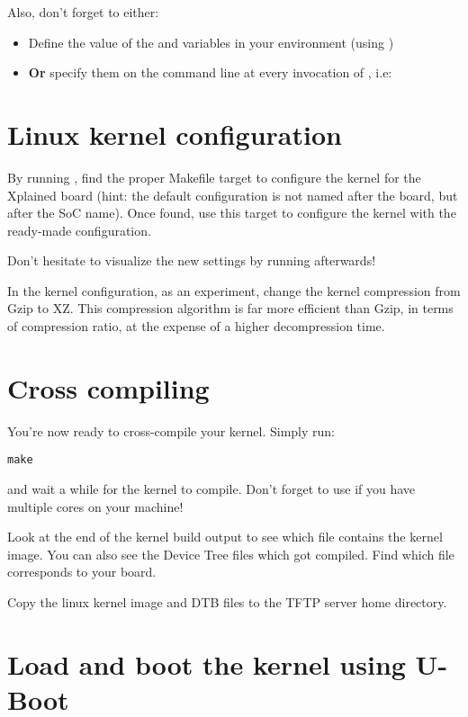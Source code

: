 Also, don't forget to either:

\begin{itemize}
\item Define the value of the  and 
  variables in your environment (using )
\item {\bf Or} specify them on the command line at every invocation of
  , i.e: 
\end{itemize}

\section{Linux kernel configuration}

By running , find the proper Makefile target to
configure the kernel for the Xplained board (hint: the default
configuration is not named after the board, but after the SoC
name). Once found, use this target to configure the kernel with the
ready-made configuration.

Don't hesitate to visualize the new settings by running
 afterwards!

In the kernel configuration, as an experiment, change the kernel
compression from Gzip to XZ. This compression algorithm is far more
efficient than Gzip, in terms of compression ratio, at the expense of
a higher decompression time.

\section{Cross compiling}

You're now ready to cross-compile your kernel. Simply run:

\begin{verbatim}
make
\end{verbatim}

and wait a while for the kernel to compile. Don't forget to use
 if you have multiple cores on your machine!

Look at the end of the kernel build output to see which file contains
the kernel image. You can also see the Device Tree  files
which got compiled. Find which  file corresponds to your
board.

Copy the linux kernel image and DTB files to the TFTP server 
home directory.

\section{Load and boot the kernel using U-Boot}

